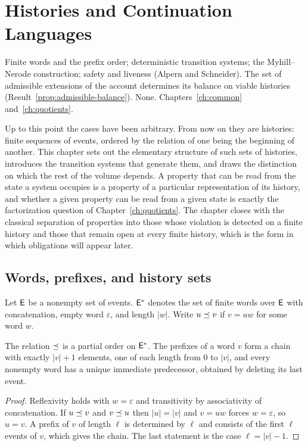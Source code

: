 \chapter{Histories and Continuation Languages}\label{ch:histories}
{Finite words and the prefix order; deterministic transition systems; the Myhill--Nerode construction; safety and liveness (Alpern and Schneider).}
{The set of admissible extensions of the account determines its balance on viable histories (Result~\ref{prop:admissible-balance}).}
{None.}
{Chapters~\ref{ch:common} and~\ref{ch:quotients}.}

Up to this point the cases have been arbitrary. From now on they are histories: finite sequences of events, ordered by the relation of one being the beginning of another. This chapter sets out the elementary structure of such sets of histories, introduces the transition systems that generate them, and draws the distinction on which the rest of the volume depends. A property that can be read from the state a system occupies is a property of a particular representation of its history, and whether a given property can be read from a given state is exactly the factorization question of Chapter~\ref{ch:quotients}. The chapter closes with the classical separation of properties into those whose violation is detected on a finite history and those that remain open at every finite history, which is the form in which obligations will appear later.

\section{Words, prefixes, and history sets}

\begin{definition}
Let $\mathsf{E}$ be a nonempty set of events. $\mathsf{E}^{*}$ denotes the set of finite words over $\mathsf{E}$ with concatenation, empty word $\varepsilon$, and length $|w|$. Write $u\preceq v$ if $v=uw$ for some word $w$.
\end{definition}

\begin{established}\label{prop:prefix}
The relation $\preceq$ is a partial order on $\mathsf{E}^{*}$. The prefixes of a word $v$ form a chain with exactly $|v|+1$ elements, one of each length from $0$ to $|v|$, and every nonempty word has a unique immediate predecessor, obtained by deleting its last event.
\end{established}
\begin{proof}
Reflexivity holds with $w=\varepsilon$ and transitivity by associativity of concatenation. If $u\preceq v$ and $v\preceq u$ then $|u|=|v|$ and $v=uw$ forces $w=\varepsilon$, so $u=v$. A prefix of $v$ of length $\ell$ is determined by $\ell$ and consists of the first $\ell$ events of $v$, which gives the chain. The last statement is the case $\ell=|v|-1$.
\end{proof}

